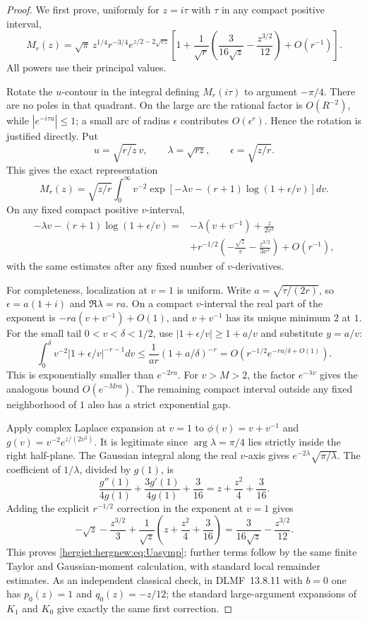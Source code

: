 \begin{proof}
We first prove, uniformly for $z=i\tau$ with $\tau$ in any compact
positive interval,
\begin{equation}\label{hergjet:hergnew:eq:Uasymp}
 M_r(z)=\sqrt\pi\,z^{1/4}r^{-3/4}
 e^{z/2-2\sqrt{rz}}
 \left[1+\frac1{\sqrt r}
       \left(\frac3{16\sqrt z}-\frac{z^{3/2}}{12}\right)
       +O(r^{-1})\right].
\end{equation}
All powers use their principal values.

Rotate the $u$-contour in the integral defining $M_r(i\tau)$ to
argument $-\pi/4$. There are no poles in that quadrant. On the large
arc the rational factor is $O(R^{-2})$, while
$|e^{-i\tau u}|\le1$; a small arc of radius $\epsilon$ contributes
$O(\epsilon^r)$.
Hence the rotation is justified directly. Put
\[
 u=\sqrt{r/z}\,v,\qquad
 \lambda=\sqrt{rz},\qquad \epsilon=\sqrt{z/r}.
\]
This gives the exact representation
\[
 M_r(z)=\sqrt{z/r}\int_0^\infty v^{-2}
  \exp\left[-\lambda v-(r+1)\log(1+\epsilon/v)\right]dv.
\]
On any fixed compact positive $v$-interval,
\begin{align*}
 -\lambda v-(r+1)\log(1+\epsilon/v)
 ={}&-\lambda(v+v^{-1})+\frac{z}{2v^2}\\
 &+r^{-1/2}\left(-\frac{\sqrt z}{v}
                    -\frac{z^{3/2}}{3v^3}\right)+O(r^{-1}),
\end{align*}
with the same estimates after any fixed number of $v$-derivatives.

For completeness, localization at $v=1$ is uniform. Write
$a=\sqrt{\tau/(2r)}$, so $\epsilon=a(1+i)$ and
$\Re\lambda=ra$. On a compact $v$-interval the real part of the
exponent is $-ra(v+v^{-1})+O(1)$, and $v+v^{-1}$ has its unique
minimum $2$ at $1$. For the small tail $0<v<\delta<1/2$, use
$|1+\epsilon/v|\ge1+a/v$ and substitute $y=a/v$:
\[
 \int_0^\delta v^{-2}|1+\epsilon/v|^{-r-1}dv
 \le\frac1{ar}(1+a/\delta)^{-r}
 =O\left(r^{-1/2}e^{-ra/\delta+O(1)}\right).
\]
This is exponentially smaller than $e^{-2ra}$.
For $v>M>2$, the factor $e^{-\lambda v}$ gives the analogous
bound $O(e^{-Mra})$. The remaining compact interval outside any
fixed neighborhood of $1$ also has a strict exponential gap.

Apply complex Laplace expansion at $v=1$ to
$\phi(v)=v+v^{-1}$ and
$g(v)=v^{-2}e^{z/(2v^2)}$.
It is legitimate since $\arg\lambda=\pi/4$ lies strictly inside
the right half-plane. The Gaussian integral along the real $v$-axis
gives $e^{-2\lambda}\sqrt{\pi/\lambda}$.
The coefficient of $1/\lambda$, divided by $g(1)$, is
\[
 \frac{g''(1)}{4g(1)}+\frac{3g'(1)}{4g(1)}+\frac3{16}
 =z+\frac{z^2}4+\frac3{16}.
\]
Adding the explicit $r^{-1/2}$ correction in the exponent at $v=1$
gives
\[
 -\sqrt z-\frac{z^{3/2}}3
 +\frac1{\sqrt z}\left(z+\frac{z^2}4+\frac3{16}\right)
 =\frac3{16\sqrt z}-\frac{z^{3/2}}{12}.
\]
This proves \eqref{hergjet:hergnew:eq:Uasymp}; further terms follow by the same
finite Taylor and Gaussian-moment calculation, with standard local
remainder estimates. As an independent classical check, in DLMF~13.8.11
with $b=0$ one has $p_0(z)=1$ and $q_0(z)=-z/12$; the standard large-argument
expansions of $K_1$ and $K_0$ give exactly the same first correction.


\end{proof}
